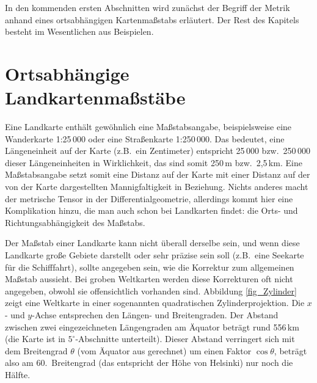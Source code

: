 In den kommenden ersten Abschnitten wird zun\"achst der Begriff der Metrik anhand eines ortsabh\"angigen
Kartenma\ss stabs erl\"autert. Der Rest des Kapitels besteht im Wesentlichen aus Beispielen.

\section{Ortsabh\"angige Landkartenma\ss st\"abe}
\label{sec_ortsabhaengig}

Eine Landkarte enth\"alt 
gew\"ohnlich eine Ma\ss stabsangabe, beispielsweise eine
Wanderkarte 1:25\,000 oder eine Stra\ss enkarte 1:250\,000. Das bedeutet, eine
L\"angeneinheit auf der Karte (z.B.\ ein Zentimeter) entspricht 25\,000 bzw.\ 250\,000 dieser 
L\"angeneinheiten in Wirklichkeit, das sind somit 250\,m bzw.\ 2,5\,km.  
Eine Ma\ss stabsangabe setzt somit eine Distanz auf der Karte mit einer Distanz auf der
von der Karte dargestellten Mannigfaltigkeit in Beziehung. Nichts anderes macht der metrische
Tensor in der Differentialgeometrie, allerdings kommt hier eine Komplikation hinzu, die man
auch schon bei Landkarten findet: die Orts- und Richtungsabh\"angigkeit des Ma\ss stabs.

Der Ma\ss stab einer Landkarte kann nicht \"uberall derselbe sein, und wenn diese
Landkarte gro\ss e Gebiete darstellt oder sehr pr\"azise sein soll
(z.B.\ eine Seekarte f\"ur die Schifffahrt), sollte angegeben sein, wie die Korrektur zum
allgemeinen Ma\ss stab aussieht. Bei groben Weltkarten werden diese Korrekturen oft nicht
angegeben, obwohl sie offensichtlich vorhanden sind. Abbildung \ref{fig_Zylinder} zeigt eine Weltkarte
in einer sogenannten 
quadratischen Zylinderprojektion. Die $x$- und $y$-Achse entsprechen
den L\"angen- und Breitengraden. Der Abstand zwischen zwei eingezeichneten L\"angengraden am
\"Aquator betr\"agt rund 556\,km (die Karte ist in $5^\circ$-Abschnitte unterteilt). Dieser
Abstand verringert sich mit dem Breitengrad $\theta$ (vom \"Aquator aus gerechnet) um einen Faktor
$\cos \theta$, betr\"agt also am 60.\ Breitengrad (das entspricht der H\"ohe von Helsinki) nur noch die H\"alfte.   

